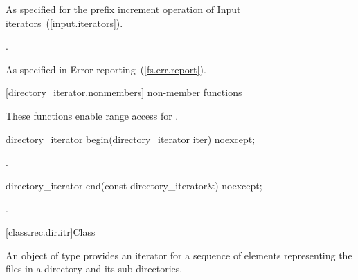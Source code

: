 \begin{itemdescr}

\pnum
\effects As specified for the prefix increment operation of
Input iterators~(\ref{input.iterators}).

\pnum
\returns {}.

\pnum
\throws As specified in Error reporting~(\ref{fs.err.report}).

\end{itemdescr}

[directory_iterator.nonmembers]{ non-member functions}

\pnum
These functions enable range access for .

%
\begin{itemdecl}
directory_iterator begin(directory_iterator iter) noexcept;
\end{itemdecl}

\begin{itemdescr}
\pnum
\returns {}.
\end{itemdescr}

%
\begin{itemdecl}
directory_iterator end(const directory_iterator&) noexcept;
\end{itemdecl}

\begin{itemdescr}
\pnum
\returns {}.
\end{itemdescr}

[class.rec.dir.itr]{Class }

%
\pnum
An object of type  provides an iterator for
a sequence of  elements representing the files in a
directory and its sub-directories.

